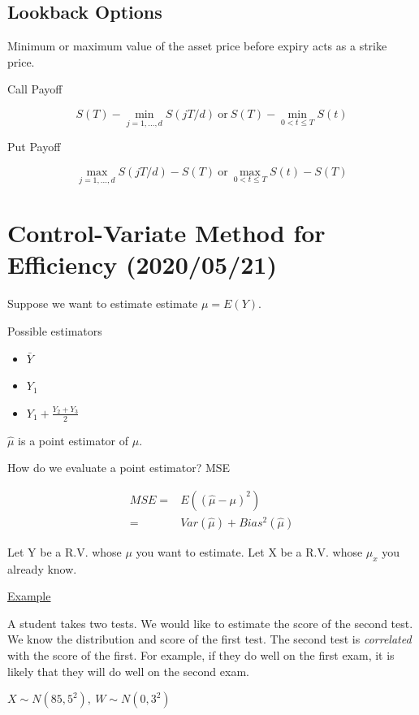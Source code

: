 \documentclass[11pt]{article}
\begin{document}
\subsection{Lookback Options}
\label{sec:org583c1b3}

Minimum or maximum value of the asset price before expiry acts as a strike
price.

Call Payoff

$$
S(T) - \min_{j = 1,...,d} S(jT/d) \ \text{or} \ S(T) - \min_{0 < t \leq T} S(t)
$$


Put Payoff

$$
\max_{j = 1,...,d} S(jT/d) - S(T) \ \text{or} \ \max_{0 < t \leq T} S(t) - S(T)
$$
\section{Control-Variate Method for Efficiency (2020/05/21)}
\label{sec:org55d48b9}

Suppose we want to estimate estimate \(\mu = E(Y)\).

Possible estimators
\begin{itemize}
\item \(\bar Y\)
\item \(Y_1\)
\item \(Y_1 + \frac{Y_2 + Y_3}{2}\)
\end{itemize}

\(\hat \mu\) is a point estimator of \(\mu\).

How do we evaluate a point estimator? MSE

\begin{equation}
\begin{split}
MSE = & E((\hat \mu - \mu)^2)\\
= & Var(\hat \mu) + Bias^2(\hat \mu)
\end{split}
\end{equation}

Let Y be a R.V. whose \(\mu\) you want to estimate.
Let X be a R.V. whose \(\mu_x\) you already know.

\uline{Example}

A student takes two tests. We would like to estimate the score of the second
test. We know the distribution and score of the first test. The second test is
\emph{correlated} with the score of the first. For example, if they do well on the
first exam, it is likely that they will do well on the second exam.

\(X \sim N(85, 5^2), \ W \sim N(0, 3^2)\)
\end{document}
